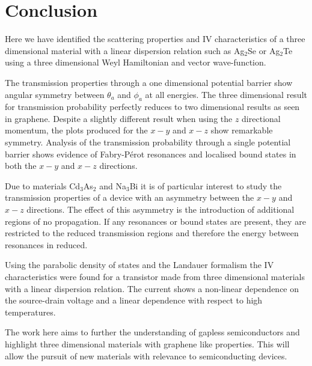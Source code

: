 \section{Conclusion}
\label{Graphene-like properties in three-dimensional gapless semiconductors. - Conclusion}
	Here we have identified the scattering properties and IV characteristics of a three dimensional material with a linear dispersion relation such as Ag$_{2}$Se or Ag$_{2}$Te using a three dimensional Weyl Hamiltonian and vector wave-function.

	The transmission properties through a one dimensional potential barrier show angular symmetry between $\theta_{a}$ and $\phi_{a}$ at all energies. The three dimensional result for transmission probability perfectly reduces to two dimensional results as seen in graphene. Despite a slightly different result when using the $z$ directional momentum, the plots produced for the $x-y$ and $x-z$ show remarkable symmetry. Analysis of the transmission probability through a single potential barrier shows evidence of Fabry-P\'{e}rot resonances and localised bound states in both the $x-y$ and $x-z$ directions. 

	Due to materials Cd$_{3}$As$_{2}$ and Na$_{3}$Bi it is of particular interest to study the transmission properties of a device with an asymmetry between the $x-y$ and $x-z$ directions. The effect of this asymmetry is the introduction of additional regions of no propagation. If any resonances or bound states are present, they are restricted to the reduced transmission regions and therefore the energy between resonances in reduced.

	Using the parabolic density of states and the Landauer formalism the IV characteristics were found for a transistor made from three dimensional materials with a linear dispersion relation. The current shows a non-linear dependence on the source-drain voltage and a linear dependence with respect to high temperatures.
	
	The work here aims to further the understanding of gapless semiconductors and highlight three dimensional materials with graphene like properties. This will allow the pursuit of new materials with relevance to semiconducting devices.
%